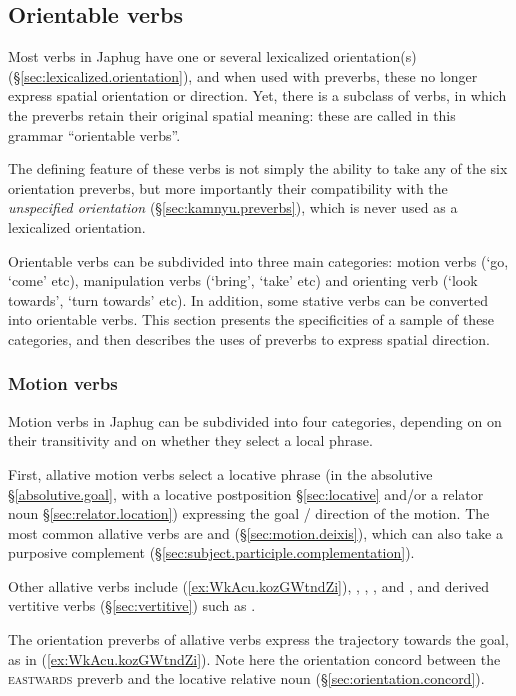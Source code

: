 \subsection{Orientable verbs} \label{sec:orientable.verbs}
Most verbs in Japhug have one or several lexicalized orientation(s) (§\ref{sec:lexicalized.orientation}), and when used with preverbs, these no longer express spatial orientation or direction. Yet, there is a subclass of verbs, in which the preverbs retain their original spatial meaning: these are called in this grammar ``orientable verbs''.

The defining feature of these verbs is not simply the ability to take any of the six orientation preverbs, but more importantly their compatibility with the \textit{unspecified orientation} (§\ref{sec:kamnyu.preverbs}), which is never used as a lexicalized orientation.

Orientable verbs can be subdivided into three main categories: motion verbs (`go, `come' etc), manipulation verbs (`bring', `take' etc) and orienting verb (`look towards', `turn towards' etc). In addition, some stative verbs can be converted into orientable verbs. This section presents the specificities of a sample of these categories, and then describes the uses of preverbs to express spatial direction.

\subsubsection{Motion verbs} \label{sec:motion.verbs}
Motion verbs in Japhug can be subdivided into four categories, depending on on their transitivity and on whether they select a local phrase.

First, allative motion verbs select a locative phrase (in the absolutive §\ref{absolutive.goal}, with a locative postposition §\ref{sec:locative} and/or a relator noun §\ref{sec:relator.location}) expressing the goal / direction of the motion. The most common allative verbs are  and  (§\ref{sec:motion.deixis}), which can also take a purposive complement (§\ref{sec:subject.participle.complementation}).

Other allative verbs include  (\ref{ex:WkAcu.kozGWtndZi}), , , ,  and , and derived vertitive verbs (§\ref{sec:vertitive}) such as .

The orientation preverbs of allative verbs express the trajectory towards the goal, as in (\ref{ex:WkAcu.kozGWtndZi}). Note here the orientation concord between the \textsc{eastwards} preverb  and the locative relative noun  (§\ref{sec:orientation.concord}).


